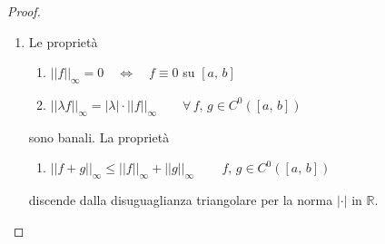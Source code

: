 \begin{proof}
\begin{enumerate}[labelindent=\parindent,leftmargin=*,label=\textnormal{(\roman*)},start=1]
\item Le proprietà
	\begin{enumerate}[labelindent=\parindent,leftmargin=*,label=\textnormal{(N\arabic*)},start=1]
	\item $||f||_{\infty} = 0 \quad\Longleftrightarrow\quad f \equiv 0$ su $[a,\,b]$
	\item $||\lambda f||_{\infty} = |\lambda| \cdot ||f||_{\infty} \qquad \forall \, f,\,g \in C^0([a,\,b])$
	\end{enumerate}
sono banali. La proprietà
	\begin{enumerate}[labelindent=\parindent,leftmargin=*,label=\textnormal{(N\arabic*)},start=3]
	\item $||f+g||_{\infty} \leq ||f||_{\infty} + ||g||_{\infty} \qquad \, f,\,g \in C^0([a,\,b])$
	\end{enumerate}
discende dalla disuguaglianza triangolare per la norma $|\cdot|$ in $\mathbb{R}$.


\end{enumerate}
\end{proof}
